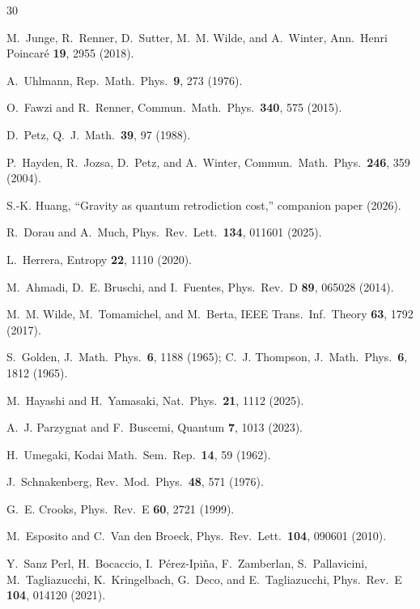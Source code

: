 \documentclass[prl,twocolumn,superscriptaddress,longbibliography,floatfix]{revtex4-2}
\begin{document}
\begin{thebibliography}{30}

M.~Junge, R.~Renner, D.~Sutter, M.~M. Wilde, and A.~Winter,
Ann.\ Henri Poincar\'e \textbf{19}, 2955 (2018).

A.~Uhlmann,
Rep.\ Math.\ Phys.\ \textbf{9}, 273 (1976).

O.~Fawzi and R.~Renner,
Commun.\ Math.\ Phys.\ \textbf{340}, 575 (2015).

D.~Petz,
Q.\ J.\ Math.\ \textbf{39}, 97 (1988).

P.~Hayden, R.~Jozsa, D.~Petz, and A.~Winter,
Commun.\ Math.\ Phys.\ \textbf{246}, 359 (2004).

S.-K. Huang,
``Gravity as quantum retrodiction cost,''
companion paper (2026).

R.~Dorau and A.~Much,
Phys.\ Rev.\ Lett.\ \textbf{134}, 011601 (2025).

L.~Herrera,
Entropy \textbf{22}, 1110 (2020).

M.~Ahmadi, D.~E. Bruschi, and I.~Fuentes,
Phys.\ Rev.\ D \textbf{89}, 065028 (2014).

M.~M. Wilde, M.~Tomamichel, and M.~Berta,
IEEE Trans.\ Inf.\ Theory \textbf{63}, 1792 (2017).

S.~Golden,
J.\ Math.\ Phys.\ \textbf{6}, 1188 (1965);
C.~J. Thompson,
J.\ Math.\ Phys.\ \textbf{6}, 1812 (1965).

M.~Hayashi and H.~Yamasaki,
Nat.\ Phys.\ \textbf{21}, 1112 (2025).

A.~J. Parzygnat and F.~Buscemi,
Quantum \textbf{7}, 1013 (2023).

H.~Umegaki,
Kodai Math.\ Sem.\ Rep.\ \textbf{14}, 59 (1962).

J.~Schnakenberg,
Rev.\ Mod.\ Phys.\ \textbf{48}, 571 (1976).

G.~E. Crooks,
Phys.\ Rev.\ E \textbf{60}, 2721 (1999).

M.~Esposito and C.~Van den Broeck,
Phys.\ Rev.\ Lett.\ \textbf{104}, 090601 (2010).

Y.~Sanz Perl, H.~Bocaccio, I.~P\'erez-Ipi\~na,
F.~Zamberlan, S.~Pallavicini, M.~Tagliazucchi,
K.~Kringelbach, G.~Deco, and E.~Tagliazucchi,
Phys.\ Rev.\ E \textbf{104}, 014120 (2021).


\end{thebibliography}
\end{document}
